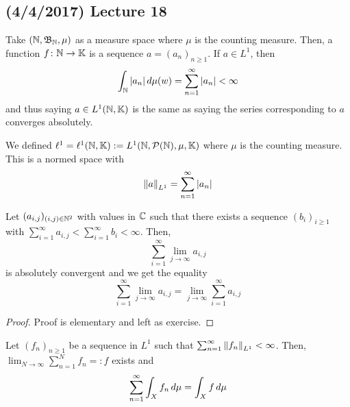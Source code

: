 \documentclass[11pt,leqno,oneside]{amsbook}
\numberwithin{thm}{section}
\renewcommand{\P}{\mathcal{P}}
\newcommand{\K}{\mathbb{K}} %
\begin{document}
\subsection*{(4/4/2017) Lecture 18}
\begin{example}
  Take \((\N,\B_\N,\mu)\) as a measure space where \(\mu\) is the
  counting measure. Then, a function \(f \from \N \to \K\) is a
  sequence \(a = (a_n)_{n \geq 1}\). If \(a \in L^1\), then \[
    \int_\N |a_n| \d\mu(w) = \sum_{n=1}^\infty |a_n| < \infty
  \]
  and thus saying \(a \in L^1(\N,\K)\) is the same as saying the
  series corresponding to \(a\) converges absolutely.
\end{example}
\begin{defn}
  We defined \(\ell^1 = \ell^1(\N,\K) := L^1(\N,\P(\N),\mu,\K)\) where
  \(\mu\) is the counting measure. This is a normed space with \[
    \norm[a]_{L^1} = \sum_{n=1}^\infty |a_n|
  \]
\end{defn}
\begin{cor}
  Let \((a_{i,j})_{(i,j) \in \N^2}\) with values in \(\C\) such that
  there exists a sequence
  \((b_i)_{i \geq 1}\) with \(\sum_{i=1}^\infty a_{i,j} <
  \sum_{i=1}^\infty b_i < \infty\).
  Then, \[
    \sum_{i=1}^\infty \lim_{j \to \infty} a_{i,j}
  \]
  is absolutely convergent and we get the equality \[
    \sum_{i=1}^\infty \lim_{j \to \infty} a_{i,j} = \lim_{j \to
      \infty} \sum_{i=1}^\infty a_{i,j}
  \]
\end{cor}
\begin{proof}
  Proof is elementary and left as exercise.
\end{proof}
\begin{thm}
  Let \((f_n)_{n \geq 1}\) be a sequence in \(L^1\) such that
  \(\sum_{n=1}^\infty \norm[f_n]_{L^1} < \infty\). Then, \(\lim_{N \to
  \infty} \sum_{n=1}^N f_n =: f\) exists
  and \[
    \sum_{n=1}^\infty \int_X f_n \d\mu = \int_X f \d\mu
  \]
\end{thm}
\end{document}

